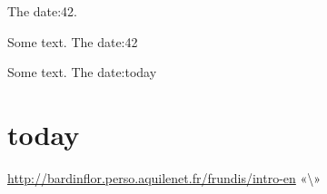 The date:42.


Some text. The date:42

Some text. The date:today

\chapter{today}
\label{s:1}
\url{http://bardinflor.perso.aquilenet.fr/frundis/intro-en}
«\textbackslash{}»

